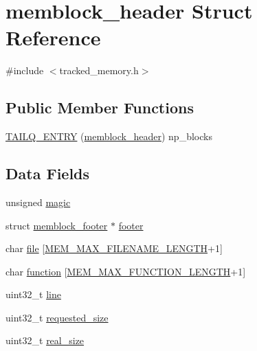 \section{memblock\-\_\-header Struct Reference}
\label{structmemblock__header}


{\ttfamily \#include $<$tracked\-\_\-memory.\-h$>$}

\subsection*{Public Member Functions}
\begin{DoxyCompactItemize}
\item 
\hyperlink{structmemblock__header_a566a8f9bbca747216118ce5c38518fc0}{T\-A\-I\-L\-Q\-\_\-\-E\-N\-T\-R\-Y} (\hyperlink{structmemblock__header}{memblock\-\_\-header}) np\-\_\-blocks
\end{DoxyCompactItemize}
\subsection*{Data Fields}
\begin{DoxyCompactItemize}
\item 
unsigned \hyperlink{structmemblock__header_a10ebc950edccb690a784aceb6362d696}{magic}
\item 
struct \hyperlink{structmemblock__footer}{memblock\-\_\-footer} $\ast$ \hyperlink{structmemblock__header_a21ce1e9005809a1f4ac9d9fc16f0ccc6}{footer}
\item 
char \hyperlink{structmemblock__header_a97093dcb31daa58a36e471701b63d0d3}{file} \mbox{[}\hyperlink{tracked__memory_8h_ac811ed79333c5131bf74f609b0b67fcf}{M\-E\-M\-\_\-\-M\-A\-X\-\_\-\-F\-I\-L\-E\-N\-A\-M\-E\-\_\-\-L\-E\-N\-G\-T\-H}+1\mbox{]}
\item 
char \hyperlink{structmemblock__header_ab3a09c5ab1300cb51e93ff910431c40f}{function} \mbox{[}\hyperlink{tracked__memory_8h_af15f994b428f827c19ae31d1df47d7ca}{M\-E\-M\-\_\-\-M\-A\-X\-\_\-\-F\-U\-N\-C\-T\-I\-O\-N\-\_\-\-L\-E\-N\-G\-T\-H}+1\mbox{]}
\item 
uint32\-\_\-t \hyperlink{structmemblock__header_aa2bb67f4837cf735956c591e23e4c800}{line}
\item 
uint32\-\_\-t \hyperlink{structmemblock__header_a9f32a9108b8ca49a6296605b42ee3a54}{requested\-\_\-size}
\item 
uint32\-\_\-t \hyperlink{structmemblock__header_acbea4f5572643309ac41e9493baaa7f7}{real\-\_\-size}
\end{DoxyCompactItemize}


